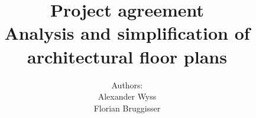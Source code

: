 \documentclass[11pt, a4paper]{report}
\begin{document}
	\title{\textbf{Project agreement \\ Analysis and simplification of architectural floor plans}}
	\author{
		Authors: \\
		Alexander Wyss \\
		Florian Bruggisser \\
	}
	\maketitle
	\tableofcontents
	
	
	
	
	
	
	
\end{document}
